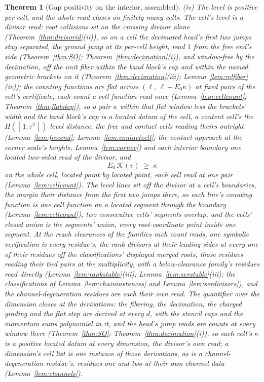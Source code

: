 \documentclass[11pt]{article}
\newtheorem{theorem}{Theorem}
\theoremstyle{definition}
\begin{document}
\begin{theorem}[Gap positivity on the interior, assembled]
\emph{(iv) The level is positive per cell, and the whole read closes
on finitely many cells.} The cell's level is a divisor read: root
collisions sit on the crossing divisor alone
(Theorem~\ref{thm:divisorid}(ii)), so on a cell the decimated head's
first two jumps stay separated, the ground jump at its per-cell
height, read $1$ from the free end's side
(Theorem~\ref{thm:SO}; Theorem~\ref{thm:decimation}(i)), and
window-free by the decimation, off the unit fiber within the band
block's cap and within the named geometric brackets on it
(Theorem~\ref{thm:decimation}(iii); Lemma~\ref{lem:relfiber}(iv)); the
counting functions are flat across $(\ell,\ \ell+E_0\kappa)$ at fixed
pairs of the cell's certificate, each count a cell function read
once (Lemma~\ref{lem:cellcount}; Theorem~\ref{thm:flatstep}), so a
pair $\kappa$ within that flat window less the brackets' width and
the band block's cap is a located datum of the cell, a content cell's the
$H([\,1:\tau^2\,])$ level distance, the free and contact cells
reading theirs outright (Lemma~\ref{lem:freeend};
Lemma~\ref{lem:contactcell}; the contact
approach at the corner scale's heights, Lemma~\ref{lem:corner}) and each
interior boundary one located two-sided read of the divisor, and
\[
E_0\,\mathcal K(v)\;\ge\;\kappa
\]
on the whole cell, located point by located point, each cell read at
one pair (Lemma~\ref{lem:cellcount}). The level lines sit off the
divisor at a cell's boundaries, the margin their distance from the
first two jumps there, so each line's counting function is one cell
function on a located segment through the boundary
(Lemma~\ref{lem:cellcount}), two consecutive cells' segments
overlap, and the cells' closed union is the segments' union, every
root-coordinate point inside one segment. At the reach clearances of
the families each count reads, one
symbolic verification is every residue's, the rank divisors at
their leading sides at every one of their residues off the
classifications' displayed merged roots, those residues reading
their tied pairs at the multiplicity, with a
below-clearance family's residues read directly
(Lemma~\ref{lem:rankstable}(iii); Lemma~\ref{lem:serstable}(iii);
the classifications of Lemma~\ref{lem:chaininstances} and
Lemma~\ref{lem:serdivisors}), and the
channel-degeneration residues are each their own read. The
quantifier over the dimension closes at the derivations: the fibering,
the decimation, the charged grading and the flat step are derived at every
$d$, with the stencil caps and the momentum sums polynomial in it, and
the head's jump reads are counts at every window there
(Theorem~\ref{thm:SO};
Theorem~\ref{thm:decimation}(i)), so each cell's $\kappa$ is a positive
located datum at every dimension, the divisor's own read; a
dimension's cell list is one
instance of those derivations, as is a channel-degeneration
residue's, residues one and two at their own channel data
(Lemma~\ref{lem:channels}).


\end{theorem}
\end{document}

